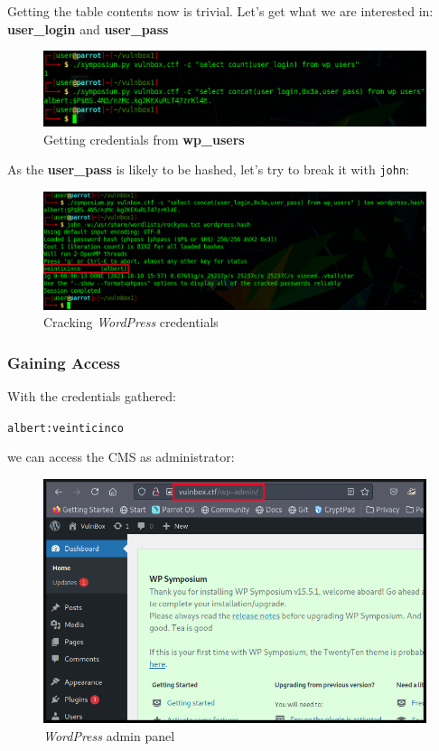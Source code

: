 \documentclass[12pt]{article}
\begin{document}
    Getting the table contents now is trivial. Let's get what we are interested
    in: \textbf{user\_login} and \textbf{user\_pass}

    \begin{figure}[H]\label{pic:31-exploit-users}
        \centering
        \includegraphics[width=1.00\textwidth]{31-exploit-users.png}
        \caption{Getting credentials from \textbf{wp\_users}}
    \end{figure}

    As the \textbf{user\_pass} is likely to be hashed, let's try to break it
    with \texttt{john}:

    \begin{figure}[H]\label{pic:32-john-wordpress}
        \centering
        \includegraphics[width=1.00\textwidth]{32-john-wordpress-gimp.png}
        \caption{Cracking \textit{WordPress} credentials}
    \end{figure}

\pagebreak
\subsubsection{Gaining Access}

    With the credentials gathered:

    \verb!albert:veinticinco!

    we can access the CMS as administrator:

    \begin{figure}[H]\label{pic:33-wp-albert}
        \centering
        \includegraphics[width=1.00\textwidth]{33-wp-albert.png}
        \caption{\textit{WordPress} admin panel}
    \end{figure}
\end{document}

